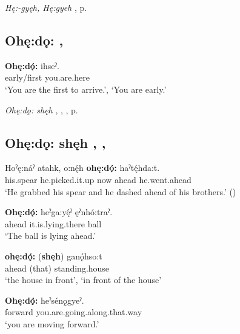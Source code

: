 \begin{CayugaRelated}
\item \textit{Hę:-gyęh, Hę:gyeh} , p. \pageref{p:[hę:-gyęh]}
\end{CayugaRelated}


\subsection*{\textbf{Ohę:dǫ:} , } \label{p:[ohę:dǫ:]}

\ea
\label{ex:opart7}
\gll \textbf{Ohę:dǫ́:} ihseˀ.\\
early/first you.are.here\\
\glt ‘You are the first to arrive.’, ‘You are early.’
\z

\begin{CayugaRelated}
\item \textit{Ohę:dǫ: shęh} , , , p. \pageref{p:[ohę:dǫ: shęh]}
\end{CayugaRelated}


\subsection*{\textbf{Ohę:dǫ: shęh} , , } \label{p:[ohę:dǫ: shęh]}

\ea
\label{ex:opart8}
\gll Hoˀę:náˀ atahk, o:nę́h \textbf{ohę:dǫ́:} haˀtę́hda:t.\\
his.spear he.picked.it.up now ahead he.went.ahead\\
\glt ‘He grabbed his spear and he dashed ahead of his brothers.’ (\cite{carrier_legends_2013})
\z

\ea
\label{ex:opart9}
\gll \textbf{Ohę:dǫ́:} heˀga:yę́ˀ ęˀnhó:traˀ.\\
ahead it.is.lying.there ball\\
\glt ‘The ball is lying ahead.’
\z

\ea
\label{ex:opart10}
\gll \textbf{ohę:dǫ́:} (\textbf{shęh}) ganǫ́hso:t\\
ahead (that) standing.house\\
\glt ‘the house in front’, `in front of the house’
\z

\ea
\label{ex:opart11}
\gll \textbf{Ohę:dǫ́:} heˀsénǫ̱gyeˀ.\\
forward you.are.going.along.that.way\\
\glt ‘you are moving forward.’
\z

